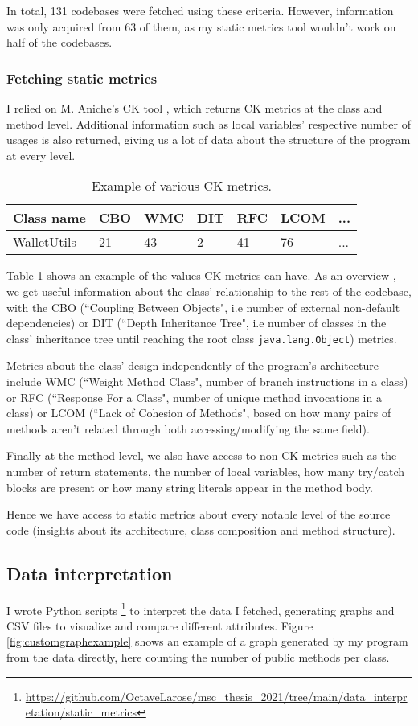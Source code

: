 \documentclass[12pt]{article}
\begin{document}
In total, 131 codebases were fetched using these criteria. However, information was only acquired from 63 of them, as my static metrics tool wouldn't work on half of the codebases.

\subsubsection{Fetching static metrics}
I relied on M. Aniche's CK tool \cite{aniche-ck}, which returns CK metrics at the class and method level. Additional information such as local variables' respective number of usages is also returned, giving us a lot of data about the structure of the program at every level.

\begin{table}
\centering
\begin{tabular}{l|l|l|l|l|l|l}
Class name & CBO & WMC & DIT & RFC & LCOM & ...
 \\ \hline
WalletUtils & 21 & 43 & 2 & 41 & 76 & ...
\end{tabular}
\caption{Example of various CK metrics.}
\label{fig:ckmetricsexample}
\end{table}

Table \ref{fig:ckmetricsexample} shows an example of the values CK metrics can have. As an overview , we get useful information about the class' relationship to the rest of the codebase, with the CBO (``Coupling Between Objects", i.e number of external non-default dependencies) or DIT (``Depth Inheritance Tree", i.e number of classes in the class' inheritance tree until reaching the root class \texttt{java.lang.Object}) metrics.

Metrics about the class' design independently of the program's architecture include WMC (``Weight Method Class", number of branch instructions in a class) or RFC (``Response For a Class", number of unique method invocations in a class) or LCOM (``Lack of Cohesion of Methods", based on how many pairs of methods aren't related through both accessing/modifying the same field).

Finally at the method level, we also have access to non-CK metrics such as the number of return statements, the number of local variables, how many try/catch blocks are present or how many string literals appear in the method body.

Hence we have access to static metrics about every notable level of the source code (insights about its architecture, class composition and method structure).


\subsection{Data interpretation}
I wrote Python scripts \footnote{\url{https://github.com/OctaveLarose/msc_thesis_2021/tree/main/data_interpretation/static_metrics}} to interpret the data I fetched, generating graphs and CSV files to visualize and compare different attributes. Figure \ref{fig:customgraphexample} shows an example of a graph generated by my program from the data directly, here counting the number of public methods per class.
\end{document}
